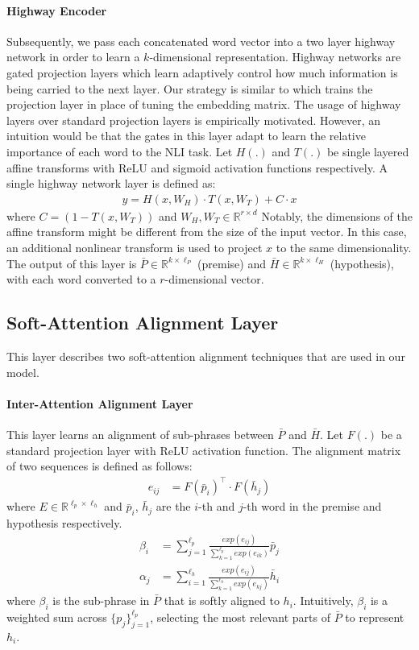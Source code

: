 \documentclass[11pt,a4paper]{article}
\begin{document}
\paragraph{Highway Encoder}
 Subsequently, we pass each concatenated word vector into a two layer highway network \cite{DBLP:journals/corr/SrivastavaGS15} in order to learn a $k$-dimensional representation. Highway networks are gated projection layers which learn adaptively control how much information is being carried to the next layer. Our strategy is similar to \cite{DBLP:conf/emnlp/ParikhT0U16} which trains the projection layer in place of tuning the embedding matrix. The usage of highway layers over standard projection layers is empirically motivated. However, an intuition would be that the gates in this layer adapt to learn the relative importance of each word to the NLI task. Let $H(.)$ and $T(.)$ be single layered affine transforms with ReLU and sigmoid activation functions respectively. A single highway network layer is defined as:
 \begin{align}
y = H(x, W_{H}) \cdot T(x, W_{T}) + C \cdot x
 \end{align}
 where $C=(1-T(x, W_{T}))$ and $W_H, W_{T} \in \mathbb{R}^{r \times d}$ Notably, the dimensions of the affine transform might be different from the size of the input vector. In this case, an additional nonlinear transform is used to project $x$ to the same dimensionality. The output of this layer is $\bar{P} \in \mathbb{R}^{k \times \ell_{P}}$ (premise) and $\bar{H} \in \mathbb{R}^{k \times \ell_{H}}$ (hypothesis), with each word converted to a $r$-dimensional vector.

\subsection{Soft-Attention Alignment Layer}
This layer describes two soft-attention alignment techniques that are used in our model.
\paragraph{Inter-Attention Alignment Layer}
This layer learns an alignment of sub-phrases between $\bar{P}$ and $\bar{H}$. Let $F(.)$ be a standard projection layer with ReLU activation function. The alignment matrix of two sequences is defined as follows:
\begin{align}
e_{ij} &= F(\bar{p}_i)^\top\cdot F(\bar{h}_j)
\end{align}
where $E \in \mathbb{R}^{\ell_{p} \times \ell_h}$ and $\bar{p}_{i}$, $\bar{h}_j$ are the $i$-th and $j$-th word in the premise and hypothesis respectively.
\begin{align}
\beta_i &= \sum^{\ell_{p}}_{j=1} \frac{exp(e_{ij})}{\sum_{k=1}^{\ell_{p}} exp(e_{ik})} \bar{p}_{j} \\
\alpha_j &= \sum^{\ell_{h}}_{i=1} \frac{exp(e_{ij})}{\sum_{k=1}^{\ell_{h}} exp(e_{kj})} \bar{h}_{i}
\end{align}
where $\beta_i$ is the sub-phrase in $\bar{P}$ that is softly aligned to $h_i$.
Intuitively, $\beta_i$ is a weighted sum across $\{p_j\}^{\ell_{p}}_{j=1}$, selecting the most relevant parts of $\bar{P}$ to represent $h_i$.
\end{document}
